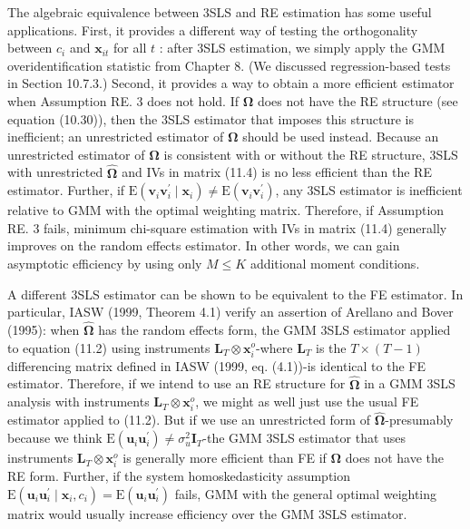 \documentclass[10pt]{article}
\begin{document}
The algebraic equivalence between 3SLS and RE estimation has some useful applications. First, it provides a different way of testing the orthogonality between $c_{i}$ and $\mathbf{x}_{i t}$ for all $t$ : after 3SLS estimation, we simply apply the GMM overidentification statistic from Chapter 8. (We discussed regression-based tests in Section 10.7.3.) Second, it provides a way to obtain a more efficient estimator when Assumption RE. 3 does not hold. If $\boldsymbol{\Omega}$ does not have the RE structure (see equation (10.30)), then the 3SLS estimator that imposes this structure is inefficient; an unrestricted estimator of $\boldsymbol{\Omega}$ should be used instead. Because an unrestricted estimator of $\boldsymbol{\Omega}$ is consistent with or without the RE structure, 3SLS with unrestricted $\hat{\boldsymbol{\Omega}}$ and IVs in matrix (11.4) is no less efficient than the RE estimator. Further, if $\mathrm{E}\left(\mathbf{v}_{i} \mathbf{v}_{i}^{\prime} \mid \mathbf{x}_{i}\right) \neq \mathrm{E}\left(\mathbf{v}_{i} \mathbf{v}_{i}^{\prime}\right)$, any 3SLS estimator is inefficient relative to GMM with the optimal weighting matrix. Therefore, if Assumption RE. 3 fails, minimum chi-square estimation with IVs in matrix (11.4) generally improves on the random effects estimator. In other words, we can gain asymptotic efficiency by using only $M \leq K$ additional moment conditions.

A different 3SLS estimator can be shown to be equivalent to the FE estimator. In particular, IASW (1999, Theorem 4.1) verify an assertion of Arellano and Bover (1995): when $\hat{\boldsymbol{\Omega}}$ has the random effects form, the GMM 3SLS estimator applied to equation (11.2) using instruments $\mathbf{L}_{T} \otimes \mathbf{x}_{i}^{o}$-where $\mathbf{L}_{T}$ is the $T \times(T-1)$ differencing matrix defined in IASW (1999, eq. (4.1))-is identical to the FE estimator. Therefore, if we intend to use an RE structure for $\hat{\boldsymbol{\Omega}}$ in a GMM 3SLS analysis with instruments $\mathbf{L}_{T} \otimes \mathbf{x}_{i}^{o}$, we might as well just use the usual FE estimator applied to (11.2). But if we use an unrestricted form of $\hat{\boldsymbol{\Omega}}$-presumably because we think $\mathrm{E}\left(\mathbf{u}_{i} \mathbf{u}_{i}^{\prime}\right) \neq \sigma_{u}^{2} \mathbf{I}_{T}$-the GMM 3SLS estimator that uses instruments $\mathbf{L}_{T} \otimes \mathbf{x}_{i}^{o}$ is generally more efficient than FE if $\boldsymbol{\Omega}$ does not have the RE form. Further, if the system homoskedasticity assumption $\mathrm{E}\left(\mathbf{u}_{i} \mathbf{u}_{i}^{\prime} \mid \mathbf{x}_{i}, c_{i}\right)=\mathrm{E}\left(\mathbf{u}_{i} \mathbf{u}_{i}^{\prime}\right)$ fails, GMM with the general optimal weighting matrix would usually increase efficiency over the GMM 3SLS estimator.
\end{document}
